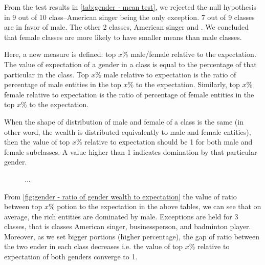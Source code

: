 From the test results in \autoref{tab:gender - mean test}, we rejected the null hypothesis in 9 out of 10 class--American singer being the only exception. 7 out of 9 classes are in favor of male. The other 2 classes, American singer and . We concluded that female classes are more likely to have smaller means than male classes.

Here, a new measure is defined: top \(x\)\% male/female relative to the expectation. The value of expectation of a gender in a class is equal to the percentage of that particular in the class. Top \(x\)\% male relative to expectation is the ratio of percentage of male entities in the top \(x\)\% to the expectation. Similarly, top \(x\)\% female relative to expectation is the ratio of percentage of female entities in the top \(x\)\% to the expectation.

When the shape of distribution of male and female of a class is the same (in other word, the wealth is distributed equivalently to male and female entities), then the value of top \(x\)\% relative to expectation should be 1 for both male and female subclasses. A value higher than 1 indicates domination by that particular gender.

\begin{figure}[htp]
\centering 
{}


\caption{...}
\label{fig:gender - ratio of gender wealth to expectation}

\end{figure}

From \autoref{fig:gender - ratio of gender wealth to expectation} the value of ratio between top \(x\)\% potion to the expectation in the above tables, we can see that on average, the rich entities are dominated by male. Exceptions are held for 3 classes, that is classes American singer, businessperson, and badminton player. Moreover, as we set bigger portions (higher percentage), the gap of ratio between the two ender in each class decreases i.e. the value of top \(x\)\% relative to expectation of both genders converge to 1.